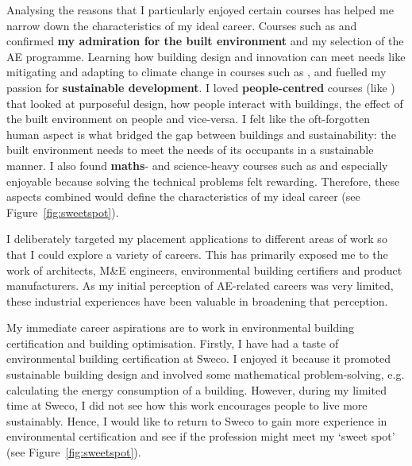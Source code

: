 Analysing the reasons that I particularly enjoyed certain courses has helped me narrow down the characteristics of my ideal career.
Courses such as \HBETitle \space and \IDTitle \space confirmed \textbf{my admiration for the built environment} and my selection of the AE programme.
Learning how building design and innovation can meet needs like mitigating and adapting to climate change in courses such as \IETitle, \EnBldgsTitle \space and \ICPTitle \space 
fuelled my passion for \textbf{sustainable development}.
I loved \textbf{people-centred} courses (like \EnvBehTitle) that looked at purposeful design, how people interact with buildings, the effect of the built environment on people and vice-versa.
I felt like the oft-forgotten human aspect is what bridged the gap between buildings and sustainability: the built environment needs to meet the needs of its occupants in a sustainable manner.
I also found \textbf{maths}- and science-heavy courses such as \HYDTitle \space and \TPSTitle \space especially enjoyable because solving the technical problems felt rewarding.
Therefore, these aspects combined would define the characteristics of my ideal career (see Figure~\ref{fig:sweetspot}).

I deliberately targeted my placement applications to different areas of work so that I could explore a variety of careers.
This has primarily exposed me to the work of architects, M\&E engineers, environmental building certifiers and product manufacturers.
As my initial perception of AE-related careers was very limited, these industrial experiences have been valuable in broadening that perception.

My immediate career aspirations are to work in environmental building certification and building optimisation.
Firstly, I have had a taste of environmental building certification at Sweco.
I enjoyed it because it promoted sustainable building design and involved some mathematical problem-solving, e.g. calculating the energy consumption of a building.
However, during my limited time at Sweco, I did not see how this work encourages people to live more sustainably.
Hence, I would like to return to Sweco to gain more experience in environmental certification and see if the profession might meet my `sweet spot' (see Figure~\ref{fig:sweetspot}).


